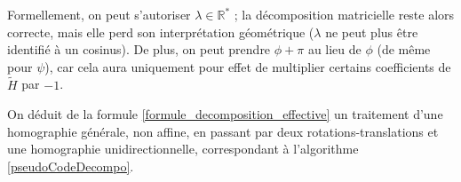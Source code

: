  Formellement, on peut s'autoriser $\lambda \in \mathbb R^*$ ; la décomposition matricielle reste alors correcte, mais elle perd son interprétation géométrique ($\lambda$ ne peut plus être identifié à un cosinus). De plus, on peut prendre $\phi + \pi$ au lieu de $\phi$ (de même pour $\psi$), car cela aura uniquement pour effet de multiplier certains coefficients de $\tilde H$ par $-1$.
 
 On déduit de la formule \ref{formule_decomposition_effective} un traitement d'une homographie générale, non affine, en passant par deux rotations-translations et une homographie unidirectionnelle, correspondant à l'algorithme \ref{pseudoCodeDecompo}.
		
	\begin{figure}
		\centering
		\\

\end{figure}
